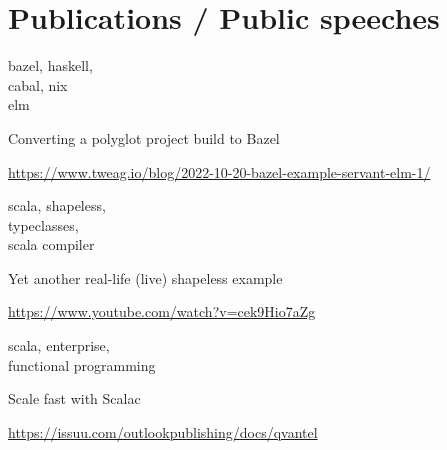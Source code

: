 \section{Publications / Public speeches}
      {bazel, haskell,\\cabal, nix\\elm}
      {Converting a polyglot project build to Bazel
        \begin{missions}
          \item \href{https://www.tweag.io/blog/2022-10-20-bazel-example-servant-elm-1/}{https://www.tweag.io/blog/2022-10-20-bazel-example-servant-elm-1/}
        \end{missions}
      }
      {scala, shapeless,\\typeclasses,\\scala compiler}
      {Yet another real-life (live) shapeless example
        \begin{missions}
          \item \href{https://www.youtube.com/watch?v=cek9Hio7aZg}{https://www.youtube.com/watch?v=cek9Hio7aZg}
        \end{missions}
      }
      {scala, enterprise,\\functional programming}
      {Scale fast with Scalac
        \begin{missions}
          \item \href{https://issuu.com/outlookpublishing/docs/qvantel}{https://issuu.com/outlookpublishing/docs/qvantel}
        \end{missions}
      }
